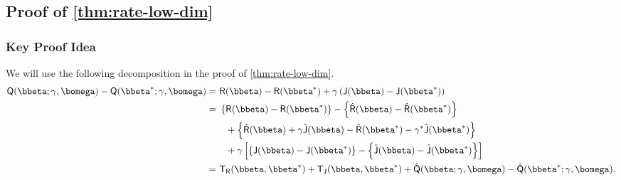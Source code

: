 \documentclass[10pt]{article}
\numberwithin{equation}{section}
\begin{document}
\subsection{Proof of \cref{thm:rate-low-dim}}
\label{sec:proof-thm2}

\subsubsection{Key Proof Idea}

We will use the following decomposition in the proof of \cref{thm:rate-low-dim}.
\begin{align}
\label{eq:q-decomposition}
\begin{split}
\mathsf{Q}(\bbeta;\gamma,\bomega) - \mathsf{Q}(\bbeta^*;\gamma,\bomega)  =& ~\mathsf{R}(\bbeta) - \mathsf{R}(\bbeta^*) + \gamma \left(\mathsf{J}(\bbeta) - \mathsf{J}(\bbeta^*)\right) \\
	=& ~\left\{\mathsf{R}(\bbeta) - \mathsf{R}(\bbeta^*)\right\} - \left\{ \hat{\mathsf{R}}(\bbeta) - \hat{\mathsf{R}}(\bbeta^*)\right\} \\ 
		&~~~+ \left\{\hat{\mathsf{R}}(\bbeta) + \gamma \hat{\mathsf{J}}(\bbeta) - \hat{\mathsf{R}}(\bbeta^*) - \gamma^*\hat{\mathsf{J}}(\bbeta^*)\right\} \\
		&~~~+ \gamma \left[\left\{\mathsf{J}(\bbeta) - \mathsf{J}(\bbeta^*)\right\} - \left\{ \hat{\mathsf{J}}(\bbeta) - \hat{\mathsf{J}}(\bbeta^*)\right\}\right] \\
	=& ~\mathsf{T}_{\mathsf{R}}(\bbeta, \bbeta^*) + \mathsf{T}_{\mathsf{J}}(\bbeta, \bbeta^*) + \hat{\mathsf{Q}}(\bbeta;\gamma, \bomega) -  \hat{\mathsf{Q}}(\bbeta^*;\gamma, \bomega).
\end{split}
\end{align}
\end{document}
